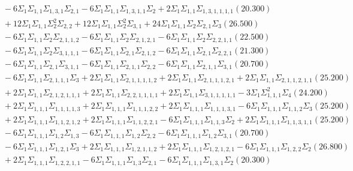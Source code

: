 \documentclass[12pt]{article}
\begin{document}
\begin{landscape}
\begin{align*}
		&\quad\quad -6\Sigma_{1}\Sigma_{1,1}\Sigma_{1,3,1}\Sigma_{2,1}-6\Sigma_{1}\Sigma_{1,1}\Sigma_{1,3,1,1}\Sigma_{2}+2\Sigma_{1}\Sigma_{1,1}\Sigma_{1,3,1,1,1,1}(20.300) \\ 
		&\quad\quad +12\Sigma_{1}\Sigma_{1,1}\Sigma_{2}^{2}\Sigma_{2,2}+12\Sigma_{1}\Sigma_{1,1}\Sigma_{2}^{2}\Sigma_{3,1}+24\Sigma_{1}\Sigma_{1,1}\Sigma_{2}\Sigma_{2,1}\Sigma_{3}(26.500) \\ 
		&\quad\quad -6\Sigma_{1}\Sigma_{1,1}\Sigma_{2}\Sigma_{2,1,1,2}-6\Sigma_{1}\Sigma_{1,1}\Sigma_{2}\Sigma_{2,1,2,1}-6\Sigma_{1}\Sigma_{1,1}\Sigma_{2}\Sigma_{2,2,1,1}(22.500) \\ 
		&\quad\quad -6\Sigma_{1}\Sigma_{1,1}\Sigma_{2}\Sigma_{3,1,1,1}-6\Sigma_{1}\Sigma_{1,1}\Sigma_{2,1}\Sigma_{2,1,2}-6\Sigma_{1}\Sigma_{1,1}\Sigma_{2,1}\Sigma_{2,2,1}(21.300) \\ 
		&\quad\quad -6\Sigma_{1}\Sigma_{1,1}\Sigma_{2,1}\Sigma_{3,1,1}-6\Sigma_{1}\Sigma_{1,1}\Sigma_{2,1,1}\Sigma_{2,2}-6\Sigma_{1}\Sigma_{1,1}\Sigma_{2,1,1}\Sigma_{3,1}(20.700) \\ 
		&\quad\quad -6\Sigma_{1}\Sigma_{1,1}\Sigma_{2,1,1,1}\Sigma_{3}+2\Sigma_{1}\Sigma_{1,1}\Sigma_{2,1,1,1,1,2}+2\Sigma_{1}\Sigma_{1,1}\Sigma_{2,1,1,1,2,1}+2\Sigma_{1}\Sigma_{1,1}\Sigma_{2,1,1,2,1,1}(25.200) \\ 
		&\quad\quad +2\Sigma_{1}\Sigma_{1,1}\Sigma_{2,1,2,1,1,1}+2\Sigma_{1}\Sigma_{1,1}\Sigma_{2,2,1,1,1,1}+2\Sigma_{1}\Sigma_{1,1}\Sigma_{3,1,1,1,1,1}-3\Sigma_{1}\Sigma_{1,1,1}^{2}\Sigma_{4}(24.200) \\ 
		&\quad\quad +2\Sigma_{1}\Sigma_{1,1,1}\Sigma_{1,1,1,1,3}+2\Sigma_{1}\Sigma_{1,1,1}\Sigma_{1,1,1,2,2}+2\Sigma_{1}\Sigma_{1,1,1}\Sigma_{1,1,1,3,1}-6\Sigma_{1}\Sigma_{1,1,1}\Sigma_{1,1,2}\Sigma_{3}(25.200) \\ 
		&\quad\quad +2\Sigma_{1}\Sigma_{1,1,1}\Sigma_{1,1,2,1,2}+2\Sigma_{1}\Sigma_{1,1,1}\Sigma_{1,1,2,2,1}-6\Sigma_{1}\Sigma_{1,1,1}\Sigma_{1,1,3}\Sigma_{2}+2\Sigma_{1}\Sigma_{1,1,1}\Sigma_{1,1,3,1,1}(25.200) \\ 
		&\quad\quad -6\Sigma_{1}\Sigma_{1,1,1}\Sigma_{1,2}\Sigma_{1,3}-6\Sigma_{1}\Sigma_{1,1,1}\Sigma_{1,2}\Sigma_{2,2}-6\Sigma_{1}\Sigma_{1,1,1}\Sigma_{1,2}\Sigma_{3,1}(20.700) \\ 
		&\quad\quad -6\Sigma_{1}\Sigma_{1,1,1}\Sigma_{1,2,1}\Sigma_{3}+2\Sigma_{1}\Sigma_{1,1,1}\Sigma_{1,2,1,1,2}+2\Sigma_{1}\Sigma_{1,1,1}\Sigma_{1,2,1,2,1}-6\Sigma_{1}\Sigma_{1,1,1}\Sigma_{1,2,2}\Sigma_{2}(26.800) \\ 
		&\quad\quad +2\Sigma_{1}\Sigma_{1,1,1}\Sigma_{1,2,2,1,1}-6\Sigma_{1}\Sigma_{1,1,1}\Sigma_{1,3}\Sigma_{2,1}-6\Sigma_{1}\Sigma_{1,1,1}\Sigma_{1,3,1}\Sigma_{2}(20.300) \\ 

\end{align*}
\end{landscape}
\end{document}
